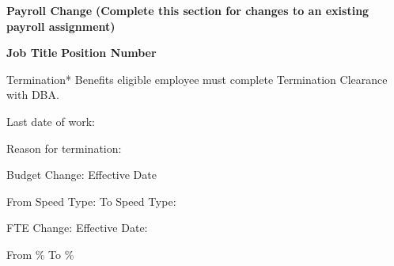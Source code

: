 \documentclass{article}
\newenvironment{temp}
{}
{}
\begin{document}
\begin{tcolorbox}[standard jigsaw, opacityback=0]
    \begin{temp}
        \LARGE\textbf{Payroll Change} \normalsize\color{blue}\textbf{(Complete this section for changes to an existing payroll assignment)}
    \end{temp}
    
    \begin{Form}
        \vspace{0.1cm}
        \textbf{Job Title} \TextField[name=jobTitle, width=9cm]{} 
        \hspace{0.3cm} \textbf{Position Number} \TextField[name= positionNumber, width=5cm]{}
    \end{Form}
\end{tcolorbox}
\vspace{-0.2cm}
\noindent
\begin{minipage}{0.50\textwidth} %
    \begin{tcolorbox}[standard jigsaw, opacityback=0, width=\textwidth]
        \begin{Form}
            \vspace{-0.1cm}
            \CheckBox[name=action1]{} Termination* \tiny Benefits eligible employee must complete
            Termination Clearance with DBA.
            
            \normalsize
            Last date of work: \TextField[name=ter_date, width=4cm]{}\vspace{0.2cm}

            Reason for termination: \TextField[name=ter_reason, width=5.5cm]{}\vspace{0.3cm}

            \CheckBox[name=action2]{} Budget Change:\hspace{0.2cm} Effective Date \TextField[name=buDate, width=3cm]{}\vspace{0.2cm}

            From Speed Type: \TextField[name=bufrom_speed, width=1.7cm]{} To Speed Type: \TextField[name=buto_speed, width=1.7cm]{}\vspace{0.3cm}

            \CheckBox[name=action3]{} FTE Change:\hspace{0.2cm} Effective Date: \TextField[name=fteDate, width=3cm]{}\vspace{0.2cm}

            From \TextField[name=fteFrom, width=3cm]{} \% \hspace{0.1cm} To \TextField[name=fteTo, width=3cm]{} \% 
        \end{Form}
    \end{tcolorbox}
\end{minipage}
\end{document}

